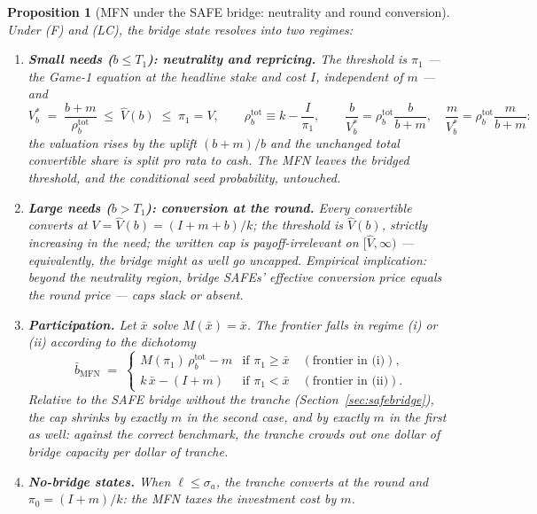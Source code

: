 \documentclass[11pt]{article}
\newtheorem{proposition}{Proposition}
\theoremstyle{definition}
\begin{document}
\begin{proposition}[MFN under the SAFE bridge: neutrality and round conversion]\label{prop:neutrality}
Under (F) and (LC), the bridge state resolves into two regimes:
\begin{enumerate}[label=(\roman*), itemsep=0pt]
\item \textbf{Small needs ($b\le T_1$): neutrality and repricing.} The threshold is $\pi_1$ --- the Game-1 equation at the \emph{headline} stake and cost $I$, independent of $m$ --- and
\[
V_b^{*} \;=\; \frac{b+m}{\rho_b^{\mathrm{tot}}} \;\le\; \hat V(b)\;\le\; \pi_1=V,
\qquad
\rho_b^{\mathrm{tot}}\equiv k-\frac{I}{\pi_1},
\qquad
\frac{b}{V_b^{*}} = \rho_b^{\mathrm{tot}}\frac{b}{b+m},
\quad
\frac{m}{V_b^{*}} = \rho_b^{\mathrm{tot}}\frac{m}{b+m}:
\]
the valuation rises by the uplift $(b+m)/b$ and the unchanged total convertible share is split pro rata to cash. The MFN leaves the bridged threshold, and the conditional seed probability, untouched.
\item \textbf{Large needs ($b>T_1$): conversion at the round.} Every convertible converts at $V=\hat V(b)=(I+m+b)/k$; the threshold is $\hat V(b)$, strictly increasing in the need; the written cap is payoff-irrelevant on $[\hat V,\infty)$ --- equivalently, the bridge might as well go uncapped. Empirical implication: beyond the neutrality region, bridge SAFEs' effective conversion price equals the round price --- caps slack or absent.
\item \textbf{Participation.} Let $\bar x$ solve $M(\bar x)=\bar x$. The frontier falls in regime (i) or (ii) according to the dichotomy
\[
\bar b_{\mathrm{MFN}} \;=\;
\begin{cases}
M(\pi_1)\,\rho_b^{\mathrm{tot}}-m & \text{if } \pi_1\ge\bar x \quad(\text{frontier in (i)}),\\[2pt]
k\,\bar x-(I+m) & \text{if } \pi_1<\bar x \quad(\text{frontier in (ii)}).
\end{cases}
\]
Relative to the SAFE bridge without the tranche (Section~\ref{sec:safebridge}), the cap shrinks by \emph{exactly} $m$ in the second case, and by exactly $m$ in the first as well: against the correct benchmark, the tranche crowds out one dollar of bridge capacity per dollar of tranche.
\item \textbf{No-bridge states.} When $\ell\le\sigma_a$, the tranche converts at the round and $\pi_0=(I+m)/k$: the MFN taxes the investment cost by $m$.
\end{enumerate}
\end{proposition}
\end{document}
